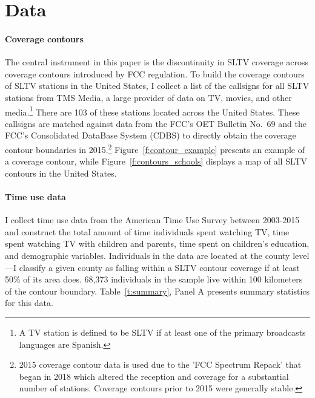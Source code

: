 \documentclass[11pt]{article}
\begin{document}
\section{Data}\label{s:data}



\paragraph{Coverage contours}  The central instrument in this paper is the discontinuity in SLTV coverage across coverage contours introduced by FCC regulation. To build the coverage contours of SLTV stations in the United States, I collect a list of the callsigns for all SLTV stations from TMS Media, a large provider of data on TV, movies, and other media.\footnote{ A TV station is defined to be SLTV if at least one of the primary broadcasts languages are Spanish.} There are 103 of these stations located across the United States. These callsigns are matched against data from the FCC's OET Bulletin No.~69 and the FCC's Consolidated DataBase System (CDBS) to directly obtain the coverage contour boundaries in 2015.\footnote{ 2015 coverage contour data is used due to the 'FCC Spectrum Repack' that began in 2018 which altered the reception and coverage for a substantial number of stations. Coverage contours prior to 2015 were generally stable. }  %
Figure~\ref{f:contour_example} presents an example of a coverage contour, while Figure~\ref{f:contours_schools} displays a map of all SLTV contours in the United States.

\paragraph{Time use data} I collect time use data from the American Time Use Survey between 2003-2015 and construct the total amount of time individuals spent watching TV, time spent watching TV with children and parents, time spent on children's education, and demographic variables. Individuals in the data are located at the county level---I classify a given county as falling within a SLTV contour coverage if at least 50\% of its area does. 68,373 individuals in the sample live within 100 kilometers of the contour boundary. Table~\ref{t:summary}, Panel A presents summary statistics for this data.  
	
\end{document}
